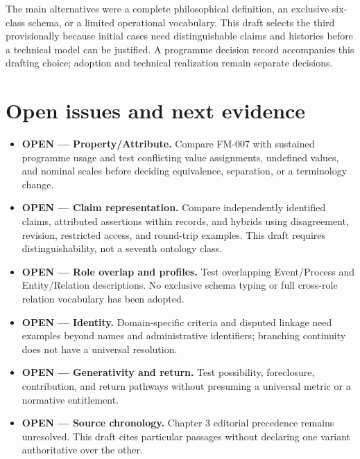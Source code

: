 \documentclass[11pt,a4paper]{article}
\begin{document}
The main alternatives were a complete philosophical definition, an exclusive six-class schema, or a limited operational vocabulary. This draft selects the third provisionally because initial cases need distinguishable claims and histories before a technical model can be justified. A programme decision record accompanies this drafting choice; adoption and technical realization remain separate decisions.

\section{Open issues and next evidence}
\begin{itemize}
\item \textbf{OPEN --- Property/Attribute.} Compare FM-007 with sustained programme usage and test conflicting value assignments, undefined values, and nominal scales before deciding equivalence, separation, or a terminology change.
\item \textbf{OPEN --- Claim representation.} Compare independently identified claims, attributed assertions within records, and hybrids using disagreement, revision, restricted access, and round-trip examples. This draft requires distinguishability, not a seventh ontology class.
\item \textbf{OPEN --- Role overlap and profiles.} Test overlapping Event/Process and Entity/Relation descriptions. No exclusive schema typing or full cross-role relation vocabulary has been adopted.
\item \textbf{OPEN --- Identity.} Domain-specific criteria and disputed linkage need examples beyond names and administrative identifiers; branching continuity does not have a universal resolution.
\item \textbf{OPEN --- Generativity and return.} Test possibility, foreclosure, contribution, and return pathways without presuming a universal metric or a normative entitlement.
\item \textbf{OPEN --- Source chronology.} Chapter 3 editorial precedence remains unresolved. This draft cites particular passages without declaring one variant authoritative over the other.
\end{itemize}
\end{document}
